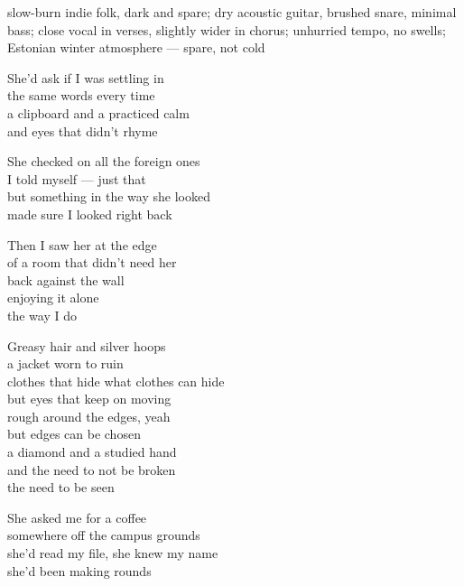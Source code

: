 

\begin{notes}
\end{notes}

\begin{style}
slow-burn indie folk, dark and spare; dry acoustic guitar, brushed snare, minimal bass; close vocal in verses, slightly wider in chorus; unhurried tempo, no swells; Estonian winter atmosphere — spare, not cold
\end{style}

\begin{lyrics}
She'd ask if I was settling in\\
the same words every time\\
a clipboard and a practiced calm\\
and eyes that didn't rhyme

She checked on all the foreign ones\\
I told myself — just that\\
but something in the way she looked\\
made sure I looked right back

Then I saw her at the edge\\
of a room that didn't need her\\
back against the wall\\
enjoying it alone\\
the way I do

Greasy hair and silver hoops\\
a jacket worn to ruin\\
clothes that hide what clothes can hide\\
but eyes that keep on moving\\
rough around the edges, yeah\\
but edges can be chosen\\
a diamond and a studied hand\\
and the need to not be broken\\
the need to be seen

She asked me for a coffee\\
somewhere off the campus grounds\\
she'd read my file, she knew my name\\
she'd been making rounds


\end{lyrics}
